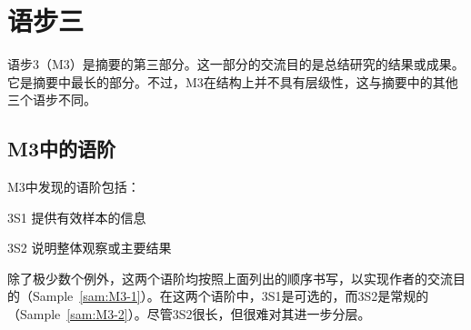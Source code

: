 \documentclass[a4paper]{ctexbook}
\begin{document}
\chapter{语步三}\label{chapter5}

语步3（M3）是摘要的第三部分。这一部分的交流目的是总结研究的结果或成果。它是摘要中最长的部分。不过，M3在结构上并不具有层级性，这与摘要中的其他三个语步不同。

\section{M3中的语阶}

M3中发现的语阶包括：

3S1 提供有效样本的信息

3S2 说明整体观察或主要结果 

除了极少数个例外，这两个语阶均按照上面列出的顺序书写，以实现作者的交流目的（Sample~\ref{sam:M3-1}）。在这两个语阶中，3S1是可选的，而3S2是常规的（Sample~\ref{sam:M3-2}）。尽管3S2很长，但很难对其进一步分层。
\end{document}
